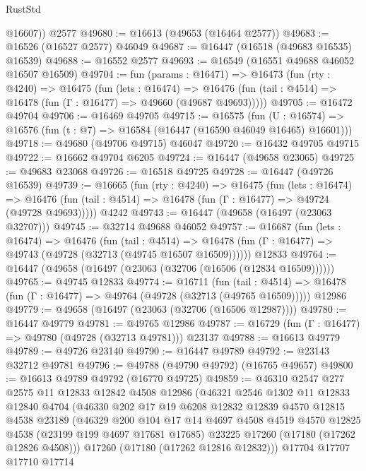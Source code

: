 \begin{lexlean}{RustStd}
\begin{coremodule}
{\begin{coremodule}
{{{{{{{{{{{{{{{{{{{{{{{{{{{{{{{{{{{{{{{{{{{{{{{{{{{{{{{        @16607))
    @2577
@49680 := @16613 (@49653 (@16464 @2577))
@49683 := @16526 (@16527 @2577) @46049
@49687 := @16447 (@16518 (@49683 @16535) @16539)
@49688 := @16552 @2577
@49693 := @16549 (@16551 @49688 @46052 @16507 @16509)
@49704 := fun (params : @16471) =>
  @16473
    (fun (rty : @4240) =>
    @16475
      (fun (lets : @16474) =>
      @16476 (fun (tail : @4514) => @16478 (fun (Γ : @16477) => @49660 (@49687 @49693)))))
@49705 := @16472 @49704
@49706 := @16469 @49705
@49715 := @16575
    (fun (U : @16574) => @16576 (fun (t : @7) => @16584 (@16447 (@16590 @46049 @16465) @16601)))
@49718 := @49680 (@49706 @49715) @46047
@49720 := @16432 @49705 @49715
@49722 := @16662 @49704 @6205
@49724 := @16447 (@49658 @23065)
@49725 := @49683 @23068
@49726 := @16518 @49725
@49728 := @16447 (@49726 @16539)
@49739 := @16665
    (fun (rty : @4240) =>
    @16475
      (fun (lets : @16474) =>
      @16476 (fun (tail : @4514) => @16478 (fun (Γ : @16477) => @49724 (@49728 @49693)))))
    @4242
@49743 := @16447 (@49658 (@16497 (@23063 @32707)))
@49745 := @32714 @49688 @46052
@49757 := @16687
    (fun (lets : @16474) =>
    @16476
      (fun (tail : @4514) =>
      @16478 (fun (Γ : @16477) => @49743 (@49728 (@32713 (@49745 @16507 @16509))))))
    @12833
@49764 := @16447 (@49658 (@16497 (@23063 (@32706 (@16506 (@12834 @16509))))))
@49765 := @49745 @12833
@49774 := @16711
    (fun (tail : @4514) => @16478 (fun (Γ : @16477) => @49764 (@49728 (@32713 (@49765 @16509)))))
    @12986
@49779 := @49658 (@16497 (@23063 (@32706 (@16506 @12987))))
@49780 := @16447 @49779
@49781 := @49765 @12986
@49787 := @16729 (fun (Γ : @16477) => @49780 (@49728 (@32713 @49781))) @23137
@49788 := @16613 @49779
@49789 := @49726 @23140
@49790 := @16447 @49789
@49792 := @23143 @32712 @49781
@49796 := @49788 (@49790 @49792) (@16765 @49657)
@49800 := @16613 @49789 @49792 (@16770 @49725)
@49859 := @46310
    @2547
    @277
    @2575
    @11
    @12833
    @12842
    @4508
    @12986
    (@46321
      @2546
      @1302
      @11
      @12833
      @12840
      @4704
      (@46330
        @202
        @17
        @19
        @6208
        @12832
        @12839
        @4570
        @12815
        @4538
        @23189
        (@46329
          @200
          @104
          @17
          @14
          @4697
          @4508
          @4519
          @4570
          @12825
          @4538
          (@23199 @199 @4697 @17681 @17685)
          @23225
          @17260
          (@17180 (@17262 @12826 @4508)))
        @17260
        (@17180 (@17262 @12816 @12832)))
      @17704
      @17707
      @17710
      @17714
}}}}}}}}}}}}}}}}}}}}}}}}}}}}}}}}}}}}}}}}}}}}}}}}}}}}}}}
\end{coremodule}}
\end{coremodule}
\end{lexlean}
